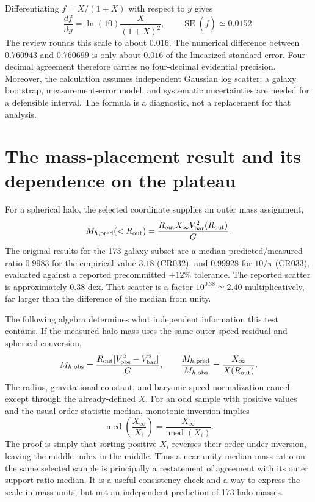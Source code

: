 Differentiating $f=X/(1+X)$ with respect to $y$ gives
\begin{equation}
 \frac{df}{dy}=\ln(10)\frac{X}{(1+X)^2},\qquad
 \operatorname{SE}(\widetilde f)\simeq0.0152.
 \label{c10:ferror}
\end{equation}
The review rounds this scale to about $0.016$. The numerical difference between $0.760943$ and $0.760699$ is only about $0.016$ of the linearized standard error. Four-decimal agreement therefore carries no four-decimal evidential precision. Moreover, the calculation assumes independent Gaussian log scatter; a galaxy bootstrap, measurement-error model, and systematic uncertainties are needed for a defensible interval. The formula is a diagnostic, not a replacement for that analysis.

\section{The mass-placement result and its dependence on the plateau}

For a spherical halo, the selected coordinate supplies an outer mass assignment,
\begin{equation}
 M_{h,{\rm pred}}(<R_{\rm out})=
 \frac{R_{\rm out}X_\infty V_{\rm bar}^2(R_{\rm out})}{G}.
 \label{c10:massplacement}
\end{equation}
The original results for the 173-galaxy subset are a median predicted/measured ratio $0.9983$ for the empirical value $3.18$ (CR032), and $0.99928$ for $10/\pi$ (CR033), evaluated against a reported precommitted $\pm12\%$ tolerance. The reported scatter is approximately $0.38$ dex. That scatter is a factor $10^{0.38}\simeq2.40$ multiplicatively, far larger than the difference of the median from unity.

The following algebra determines what independent information this test contains. If the measured halo mass uses the same outer speed residual and spherical conversion,
\begin{equation}
 M_{h,{\rm obs}}=\frac{R_{\rm out}[V_{\rm obs}^2-V_{\rm bar}^2]}{G},
 \qquad \frac{M_{h,{\rm pred}}}{M_{h,{\rm obs}}}
 =\frac{X_\infty}{X(R_{\rm out})}.
 \label{c10:ratioidentity}
\end{equation}
The radius, gravitational constant, and baryonic speed normalization cancel except through the already-defined $X$. For an odd sample with positive values and the usual order-statistic median, monotonic inversion implies
\begin{equation}
 \operatorname{med}\!\left(\frac{X_\infty}{X_i}\right)
 =\frac{X_\infty}{\operatorname{med}(X_i)}.
 \label{c10:medianidentity}
\end{equation}
The proof is simply that sorting positive $X_i$ reverses their order under inversion, leaving the middle index in the middle. Thus a near-unity median mass ratio on the same selected sample is principally a restatement of agreement with its outer support-ratio median. It is a useful consistency check and a way to express the scale in mass units, but not an independent prediction of 173 halo masses.

